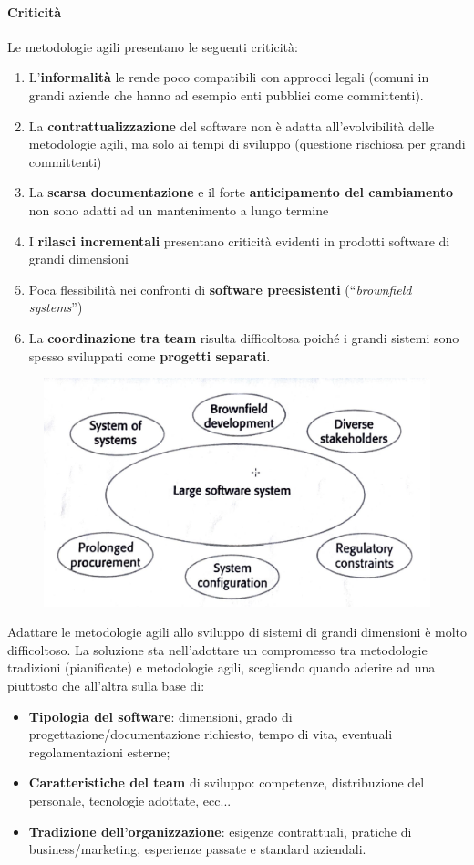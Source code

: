 \paragraph{Criticità} Le metodologie agili presentano le seguenti criticità:
\begin{enumerate}
    \item L'\textbf{informalità} le rende poco compatibili con approcci legali (comuni in grandi aziende che hanno ad esempio enti pubblici come committenti).
    \item La \textbf{contrattualizzazione} del software non è adatta all'evolvibilità delle metodologie agili, ma solo ai tempi di sviluppo (questione rischiosa per grandi committenti)
    \item La \textbf{scarsa documentazione} e il forte \textbf{anticipamento del cambiamento} non sono adatti ad un mantenimento a lungo termine
    \item I \textbf{rilasci incrementali} presentano criticità evidenti in prodotti software di grandi dimensioni
    \item Poca flessibilità nei confronti di \textbf{software preesistenti} (“\textit{brownfield systems}”)
    \item La \textbf{coordinazione tra team} risulta difficoltosa poiché i grandi sistemi sono spesso sviluppati come \textbf{progetti separati}.
\end{enumerate}

\begin{figure}[h!]
    \centering
    \includegraphics[width=0.75\linewidth]{assets/large-software.png}
    \label{fig:large-software}
\end{figure}

\newpage
Adattare le metodologie agili allo sviluppo di sistemi di grandi dimensioni è molto difficoltoso. La soluzione sta nell'adottare un compromesso tra metodologie tradizioni (pianificate) e metodologie agili, scegliendo quando aderire ad una piuttosto che all'altra sulla base di:
\begin{itemize}
    \item \textbf{Tipologia del software}: dimensioni, grado di progettazione/documentazione richiesto, tempo di vita, eventuali regolamentazioni esterne;
    \item \textbf{Caratteristiche del team} di sviluppo: competenze, distribuzione del personale, tecnologie adottate, ecc...
    \item \textbf{Tradizione dell'organizzazione}: esigenze contrattuali, pratiche di business/marketing, esperienze passate e standard aziendali.
\end{itemize}

